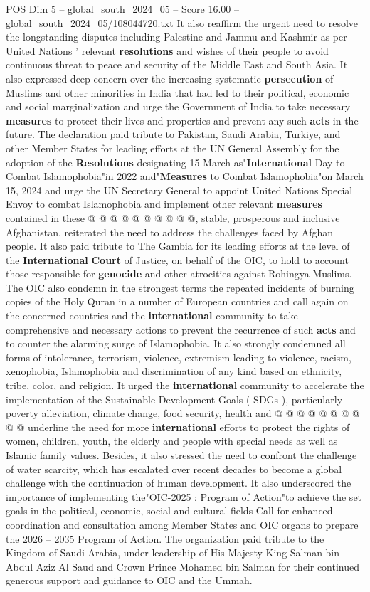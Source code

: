 \begin{textsample}{POS Dim 5 – global\_south\_2024\_05 – Score 16.00 – global\_south\_2024\_05/108044720.txt}
It also reaffirm the urgent need to resolve the longstanding disputes including Palestine and Jammu and Kashmir as per United Nations ' relevant \textbf{resolutions} and wishes of their people to avoid continuous threat to peace and security of the Middle East and South Asia.
It also expressed deep concern over the increasing systematic \textbf{persecution} of Muslims and other minorities in India that had led to their political, economic and social marginalization and urge the Government of India to take necessary \textbf{measures} to protect their lives and properties and prevent any such \textbf{acts} in the future.
The declaration paid tribute to Pakistan, Saudi Arabia, Turkiye, and other Member States for leading efforts at the UN General Assembly for the adoption of the \textbf{Resolutions} designating 15 March as"\textbf{International} Day to Combat Islamophobia"in 2022 and"\textbf{Measures} to Combat Islamophobia"on March 15, 2024 and urge the UN Secretary General to appoint United Nations Special Envoy to combat Islamophobia and implement other relevant \textbf{measures} contained in these @ @ @ @ @ @ @ @ @ @, stable, prosperous and inclusive Afghanistan, reiterated the need to address the challenges faced by Afghan people.
It also paid tribute to The Gambia for its leading efforts at the level of the \textbf{International} \textbf{Court} of Justice, on behalf of the OIC, to hold to account those responsible for \textbf{genocide} and other atrocities against Rohingya Muslims.
The OIC also condemn in the strongest terms the repeated incidents of burning copies of the Holy Quran in a number of European countries and call again on the concerned countries and the \textbf{international} community to take comprehensive and necessary actions to prevent the recurrence of such \textbf{acts} and to counter the alarming surge of Islamophobia.
It also strongly condemned all forms of intolerance, terrorism, violence, extremism leading to violence, racism, xenophobia, Islamophobia and discrimination of any kind based on ethnicity, tribe, color, and religion.
It urged the \textbf{international} community to accelerate the implementation of the Sustainable Development Goals ( SDGs ), particularly poverty alleviation, climate change, food security, health and @ @ @ @ @ @ @ @ @ @ underline the need for more \textbf{international} efforts to protect the rights of women, children, youth, the elderly and people with special needs as well as Islamic family values.
Besides, it also stressed the need to confront the challenge of water scarcity, which has escalated over recent decades to become a global challenge with the continuation of human development.
It also underscored the importance of implementing the"OIC-2025 : Program of Action"to achieve the set goals in the political, economic, social and cultural fields Call for enhanced coordination and consultation among Member States and OIC organs to prepare the 2026 -- 2035 Program of Action.
The organization paid tribute to the Kingdom of Saudi Arabia, under leadership of His Majesty King Salman bin Abdul Aziz Al Saud and Crown Prince Mohamed bin Salman for their continued generous support and guidance to OIC and the Ummah.


\end{textsample}
